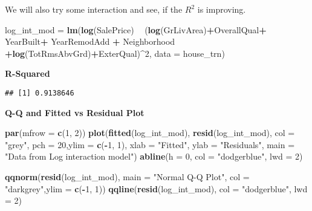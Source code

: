 \documentclass[]{article}
\newenvironment{Shaded}{\begin{snugshade}}{\end{snugshade}}
\newcommand{\KeywordTok}[1]{\textcolor[rgb]{0.13,0.29,0.53}{\textbf{#1}}}
\newcommand{\DataTypeTok}[1]{\textcolor[rgb]{0.13,0.29,0.53}{#1}}
\newcommand{\DecValTok}[1]{\textcolor[rgb]{0.00,0.00,0.81}{#1}}
\newcommand{\StringTok}[1]{\textcolor[rgb]{0.31,0.60,0.02}{#1}}
\newcommand{\OperatorTok}[1]{\textcolor[rgb]{0.81,0.36,0.00}{\textbf{#1}}}
\newcommand{\NormalTok}[1]{#1}
\begin{document}
We will also try some interaction and see, if the \(R^2\) is improving.

\begin{Shaded}
\begin{Highlighting}[]
\NormalTok{log_int_mod =}\StringTok{ }\KeywordTok{lm}\NormalTok{(}\KeywordTok{log}\NormalTok{(SalePrice) }\OperatorTok{~}\StringTok{  }\NormalTok{(}\KeywordTok{log}\NormalTok{(GrLivArea)}\OperatorTok{+}\NormalTok{OverallQual}\OperatorTok{+}\StringTok{ }\NormalTok{YearBuilt}\OperatorTok{+}\StringTok{ }\NormalTok{YearRemodAdd }\OperatorTok{+}\StringTok{ }\NormalTok{Neighborhood }\OperatorTok{+}\KeywordTok{log}\NormalTok{(TotRmsAbvGrd)}\OperatorTok{+}\NormalTok{ExterQual)}\OperatorTok{^}\DecValTok{2}\NormalTok{, }\DataTypeTok{data =}\NormalTok{ house_trn)}
\end{Highlighting}
\end{Shaded}

\textbf{R-Squared}

\begin{Shaded}
\end{Shaded}

\begin{verbatim}
## [1] 0.9138646
\end{verbatim}

\textbf{Q-Q and Fitted vs Residual Plot}

\begin{Shaded}
\begin{Highlighting}[]
\KeywordTok{par}\NormalTok{(}\DataTypeTok{mfrow =} \KeywordTok{c}\NormalTok{(}\DecValTok{1}\NormalTok{, }\DecValTok{2}\NormalTok{))}
\KeywordTok{plot}\NormalTok{(}\KeywordTok{fitted}\NormalTok{(log_int_mod), }\KeywordTok{resid}\NormalTok{(log_int_mod), }\DataTypeTok{col =} \StringTok{"grey"}\NormalTok{, }\DataTypeTok{pch =} \DecValTok{20}\NormalTok{,}\DataTypeTok{ylim =} \KeywordTok{c}\NormalTok{(}\OperatorTok{-}\DecValTok{1}\NormalTok{, }\DecValTok{1}\NormalTok{),}
    \DataTypeTok{xlab =} \StringTok{"Fitted"}\NormalTok{, }\DataTypeTok{ylab =} \StringTok{"Residuals"}\NormalTok{, }\DataTypeTok{main =} \StringTok{"Data from Log interaction model"}\NormalTok{)}
\KeywordTok{abline}\NormalTok{(}\DataTypeTok{h =} \DecValTok{0}\NormalTok{, }\DataTypeTok{col =} \StringTok{"dodgerblue"}\NormalTok{, }\DataTypeTok{lwd =} \DecValTok{2}\NormalTok{)}

\KeywordTok{qqnorm}\NormalTok{(}\KeywordTok{resid}\NormalTok{(log_int_mod), }\DataTypeTok{main =} \StringTok{"Normal Q-Q Plot"}\NormalTok{, }\DataTypeTok{col =} \StringTok{"darkgrey"}\NormalTok{,}\DataTypeTok{ylim =} \KeywordTok{c}\NormalTok{(}\OperatorTok{-}\DecValTok{1}\NormalTok{, }\DecValTok{1}\NormalTok{))}
\KeywordTok{qqline}\NormalTok{(}\KeywordTok{resid}\NormalTok{(log_int_mod), }\DataTypeTok{col =} \StringTok{"dodgerblue"}\NormalTok{, }\DataTypeTok{lwd =} \DecValTok{2}\NormalTok{)}
\end{Highlighting}
\end{Shaded}
\end{document}
